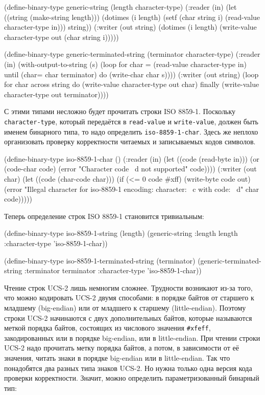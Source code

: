 \begin{myverb}
(define-binary-type generic-string (length character-type)
  (:reader (in)
    (let ((string (make-string length)))
      (dotimes (i length)
        (setf (char string i) (read-value character-type in)))
      string))
  (:writer (out string)
    (dotimes (i length)
      (write-value character-type out (char string i)))))

(define-binary-type generic-terminated-string (terminator character-type)
  (:reader (in)
    (with-output-to-string (s)
      (loop for char = (read-value character-type in)
            until (char= char terminator) do (write-char char s))))
  (:writer (out string)
    (loop for char across string
          do (write-value character-type out char)
          finally (write-value character-type out terminator))))
\end{myverb}

С этими типами несложно будет прочитать строки ISO 8859-1.  Поскольку \lstinline{character-type},
который передаётся в \lstinline{read-value} и \lstinline{write-value}, должен быть именем бинарного типа, то надо
определить \lstinline{iso-8859-1-char}.  Здесь же неплохо организовать проверку корректности читаемых
и записываемых кодов символов.

\begin{myverb}
(define-binary-type iso-8859-1-char ()
  (:reader (in)
    (let ((code (read-byte in)))
      (or (code-char code)
          (error "Character code ~d not supported" code))))
  (:writer (out char)
    (let ((code (char-code char)))
      (if (<= 0 code #xff)
          (write-byte code out)
          (error "Illegal character for iso-8859-1 encoding: character: ~c with code: ~d" 
               char code)))))
\end{myverb}

Теперь определение строк ISO 8859-1 становится тривиальным:

\begin{myverb}
(define-binary-type iso-8859-1-string (length)
  (generic-string :length length :character-type 'iso-8859-1-char))

(define-binary-type iso-8859-1-terminated-string (terminator)
  (generic-terminated-string :terminator terminator :character-type 'iso-8859-1-char))
\end{myverb}

Чтение строк UCS-2 лишь немногим сложнее.  Трудности возникают из-за того, что можно
кодировать UCS-2 двумя способами: в порядке байтов от старшего к младшему (big-endian) или
от младшего к старшему (little-endian).  Поэтому строки UCS-2 начинаются с двух
дополнительных байтов, которые называются меткой порядка байтов, состоящих из числового
значения \lstinline!#xfeff!, закодированных или в порядке big-endian, или в little-endian.
При чтении строки UCS-2 надо прочитать метку порядка байтов, а потом, в зависимости от её
значения, читать знаки в порядке big-endian или в little-endian.  Так что понадобятся два
разных типа знаков UCS-2.  Но нужна только одна версия кода проверки корректности.  Значит,
можно определить параметризованный бинарный тип:

